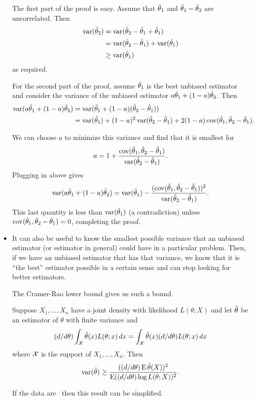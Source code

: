 \begin{itemize}
  The first part of the proof is easy.  Assume that $\hat{\theta}_1$ and $\hat{\theta}_1 -
  \hat{\theta}_2$ are uncorrelated.  Then
  \begin{align*}
    \operatorname{var}(\hat{\theta}_2) &= \operatorname{var}(\hat{\theta}_2 - \hat{\theta}_1 + \hat{\theta}_1) \\
    &= \operatorname{var}(\hat{\theta}_2 - \hat{\theta}_1) + \operatorname{var}(\hat{\theta}_1) \\
    &\geq \operatorname{var}(\hat{\theta}_1)
  \end{align*}
  as required.

  For the second part of the proof, assume $\hat{\theta}_1$ is the best unbiased
  estimator and consider the variance of the unbiased estimator $a
  \hat{\theta}_1 + (1 - a) \hat{\theta}_2$.  Then
  \begin{align*}
    \operatorname{var}(a \hat{\theta}_1 + (1 - a) \hat{\theta}_2)
    &= \operatorname{var}(\hat{\theta}_1 + (1 - a) (\hat{\theta}_2 - \hat{\theta}_1)) \\
    &= \operatorname{var}(\hat{\theta}_1) + (1 - a)^2 \operatorname{var}(\hat{\theta}_2 - \hat{\theta}_1)
    + 2 (1 - a) \operatorname{cov}(\hat{\theta}_1, \hat{\theta}_2 - \hat{\theta}_1).
  \end{align*}

  We can choose $a$ to minimize this variance and find that it is
  smallest for
  \begin{equation*}
    a = 1 + \frac{\operatorname{cov}(\hat{\theta}_1, \hat{\theta}_2 - \hat{\theta}_1)}{\operatorname{var}(\hat{\theta}_2 - \hat{\theta}_1)}.
  \end{equation*}
  Plugging in above gives
  \begin{equation*}
    \operatorname{var}(a \hat{\theta}_1 + (1 - a) \hat{\theta}_2)
    = \operatorname{var}(\hat{\theta}_1) - \frac{(\operatorname{cov}(\hat{\theta}_1, \hat{\theta}_2 - \hat{\theta}_1))^2}{\operatorname{var}(\hat{\theta}_2 - \hat{\theta}_1)}.
  \end{equation*}
  This last quantity is less than $\operatorname{var}(\hat{\theta}_1)$ (a contradiction)
  unless $\operatorname{cov}(\hat{\theta}_1, \hat{\theta}_2 - \hat{\theta}_1) = 0$, completing the proof.

\item It can also be useful to know the smallest possible variance
  that an unbiased estimator (or estimator in general) could have in a
  particular problem.  Then, if we have an unbiased estimator that has
  that variance, we know that it is ``the best'' estimator possible in
  a certain sense and can stop looking for better estimators.

  The Cramer-Rao lower bound gives us such a bound.
  \begin{thm}
    Suppose $X_1,...,X_n$ have a joint density with likelihood $L(\theta;
    X)$ and let $\hat{\theta}$ be an estimator of $\theta$ with finite variance and
    \begin{equation*}
      (d/d\theta) \int_{\mathcal{X}} \hat{\theta}(x) L(\theta; x) \,dx = \int_{\mathcal{X}} \hat{\theta}(x) (d/d\theta) L(\theta; x) \,dx
    \end{equation*}
    where $\mathcal{X}$ is the support of $X_1,...,X_n$.
    Then 
    \begin{equation*}
      \operatorname{var}(\hat{\theta}) \geq  \frac{((d/d\theta) \operatorname{E} \hat{\theta}(X))^2}{\operatorname{E} ((d/d\theta) \log L(\theta; X))^2}.
    \end{equation*}
  \end{thm}
  If the data are \iid\ then this result can be simplified.


\end{itemize}

